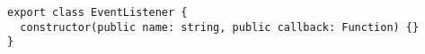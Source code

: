 \begin{verbatim}
export class EventListener {
  constructor(public name: string, public callback: Function) {}
}
\end{verbatim}
